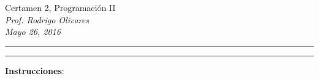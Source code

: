 \documentclass[10pt]{article}
\begin{document}
    \begin{center}
		{\Large Certamen 2, Programaci\'on II} \\
		\emph{\small Prof. Rodrigo Olivares} \\
		\emph{\scriptsize Mayo 26, 2016} 
	\end{center}

	\vspace*{-35pt}
	\begin{center}
		\rule{1\textwidth}{.3pt}
	\end{center}
	\vspace*{-42pt}
	\begin{center}
		\rule{1\textwidth}{2pt}
	\end{center}

	\vspace*{-15pt}

	{\small \textbf{Instrucciones}:}

	\vspace*{-15pt}
\end{document}
